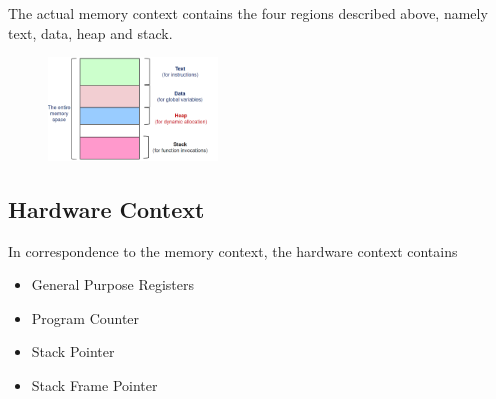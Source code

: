 \documentclass[12pt]{article}
\theoremstyle{definition}
\begin{document}
The actual memory context contains the four regions described above, namely text, data, heap and stack.
\begin{figure}[h]
\centering
\includegraphics[width=0.4\textwidth]{2_2.png}
\end{figure}
\subsection{Hardware Context}
In correspondence to the memory context, the hardware context contains
\begin{itemize}
  \item General Purpose Registers
  \item Program Counter
  \item Stack Pointer
  \item Stack Frame Pointer
\end{itemize}
\end{document}
